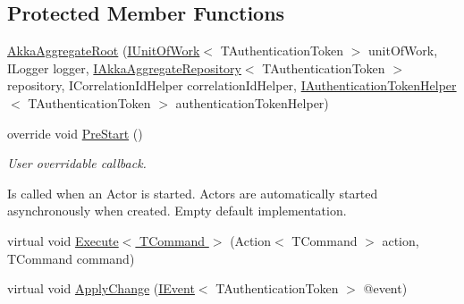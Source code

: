\subsection*{Protected Member Functions}
\begin{DoxyCompactItemize}
\item 
\hyperlink{classCqrs_1_1Akka_1_1Domain_1_1AkkaAggregateRoot_a060f981e4c3023aec36e7c6f1cfb3a9d_a060f981e4c3023aec36e7c6f1cfb3a9d}{Akka\+Aggregate\+Root} (\hyperlink{interfaceCqrs_1_1Domain_1_1IUnitOfWork}{I\+Unit\+Of\+Work}$<$ T\+Authentication\+Token $>$ unit\+Of\+Work, I\+Logger logger, \hyperlink{interfaceCqrs_1_1Akka_1_1Domain_1_1IAkkaAggregateRepository}{I\+Akka\+Aggregate\+Repository}$<$ T\+Authentication\+Token $>$ repository, I\+Correlation\+Id\+Helper correlation\+Id\+Helper, \hyperlink{interfaceCqrs_1_1Authentication_1_1IAuthenticationTokenHelper}{I\+Authentication\+Token\+Helper}$<$ T\+Authentication\+Token $>$ authentication\+Token\+Helper)
\item 
override void \hyperlink{classCqrs_1_1Akka_1_1Domain_1_1AkkaAggregateRoot_a7da2d3a244e34717ec5af1db8f0042bc_a7da2d3a244e34717ec5af1db8f0042bc}{Pre\+Start} ()
\begin{DoxyCompactList}\small\item\em User overridable callback. 

Is called when an Actor is started. Actors are automatically started asynchronously when created. Empty default implementation. \end{DoxyCompactList}\item 
virtual void \hyperlink{classCqrs_1_1Akka_1_1Domain_1_1AkkaAggregateRoot_af8a9bd0e80498b3b54beb7cbec820533_af8a9bd0e80498b3b54beb7cbec820533}{Execute$<$ T\+Command $>$} (Action$<$ T\+Command $>$ action, T\+Command command)
\item 
virtual void \hyperlink{classCqrs_1_1Akka_1_1Domain_1_1AkkaAggregateRoot_aaa135cb26be9e5353986f5611f05c059_aaa135cb26be9e5353986f5611f05c059}{Apply\+Change} (\hyperlink{interfaceCqrs_1_1Events_1_1IEvent}{I\+Event}$<$ T\+Authentication\+Token $>$ @event)
\end{DoxyCompactItemize}
